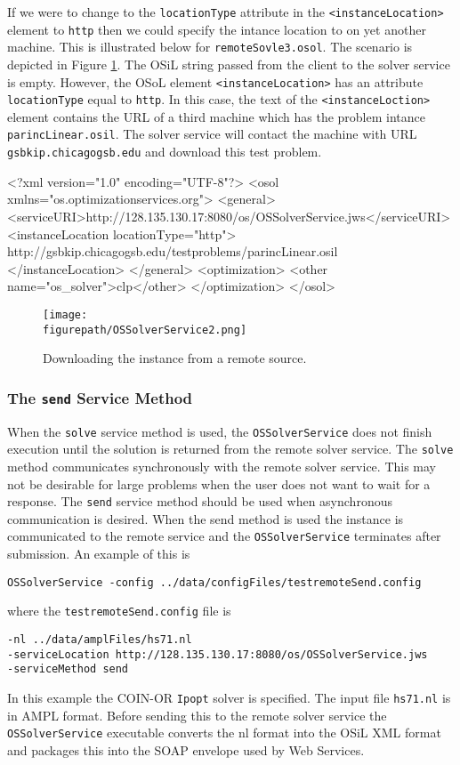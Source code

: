 \documentclass[11pt]{article}
\newcommand{\figurepath}{./figures}
\newcounter{Fig}
\renewcommand{\_}{{\char"5F}}
\renewcommand{\{}{{\char"7B}}
\renewcommand{\}}{{\char"7D}}
\renewcommand{\^}{{\char"0D}}
\renewcommand{\'}{{\char"0D}}
\begin{document}
If we were to change to the {\tt locationType} attribute in the {\tt <instanceLocation>} element to {\tt http} then we could specify the intance location to on yet another machine. This is illustrated below  for {\tt remoteSovle3.osol}.  The scenario is depicted in Figure \ref{figure:ossolverservice2}.  The OSiL string passed from the client to the solver service is empty.  However, the OSoL element {\tt <instanceLocation>}  has an attribute {\tt locationType} equal to   {\tt http}.  In this case, the text of the {\tt <instanceLoction>} element contains the URL of a third machine which has the problem intance {\tt parincLinear.osil}.  The solver service will contact the machine with URL {\tt gsbkip.chicagogsb.edu} and download this test problem. 
\begin{verbatimtab}[4]
<?xml version="1.0" encoding="UTF-8"?>
<osol xmlns="os.optimizationservices.org">
    <general>
        <serviceURI>http://128.135.130.17:8080/os/OSSolverService.jws</serviceURI>
         <instanceLocation locationType="http">
	 http://gsbkip.chicagogsb.edu/testproblems/parincLinear.osil
	 </instanceLocation>
    </general>
    <optimization>
    	<other name="os_solver">clp</other>
    </optimization>
</osol>
\end{verbatimtab}

\begin{figure}
\centering
\texttt{[image: \\figurepath/OSSolverService2.png]}
\caption{Downloading the instance from a remote source.} 
\label{figure:ossolverservice2}
\end{figure}

\subsubsection{The  {\tt send} Service Method}\label{section:send}

When the {\tt solve} service method is used, the {\tt OSSolverService} does not finish execution until the solution is returned from the remote solver service. The {\tt solve} method communicates synchronously with the remote solver service. This may not be desirable for large problems when the user does not want to wait for a response. The {\tt send} service method should be used when asynchronous communication is desired. When the send method is used the instance is communicated to the remote service and the {\tt OSSolverService} terminates after submission. An example of this is
\begin{verbatim}
OSSolverService -config ../data/configFiles/testremoteSend.config
\end{verbatim}
where the {\tt testremoteSend.config} file is
\begin{verbatim}
-nl ../data/amplFiles/hs71.nl
-serviceLocation http://128.135.130.17:8080/os/OSSolverService.jws
-serviceMethod send
\end{verbatim}
In this example the COIN-OR {\tt Ipopt} solver is specified. The input file {\tt hs71.nl} is in AMPL format. Before sending this to the remote solver service the {\tt OSSolverService} executable converts  the nl format into the OSiL XML format and packages this into the SOAP envelope used by Web Services. 
\end{document}
